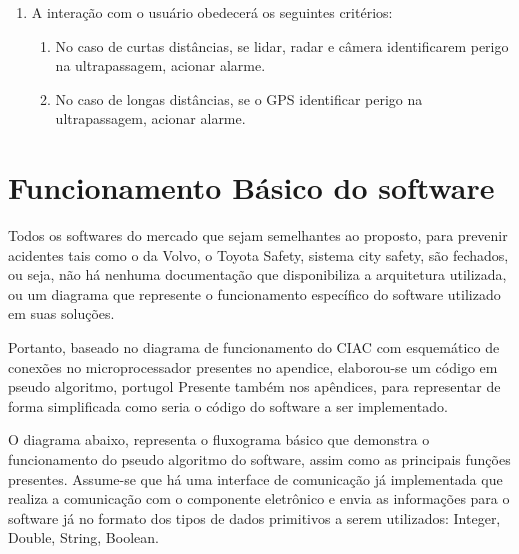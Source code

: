 \begin{enumerate}
\item A interação com o usuário obedecerá os seguintes critérios:

\begin{enumerate}
	\item No caso de curtas distâncias, se lidar, radar e câmera identificarem perigo na ultrapassagem, acionar alarme.
	\item No caso de longas distâncias, se o GPS identificar perigo na ultrapassagem, acionar alarme.

\end{enumerate}
\end{enumerate}


\section{Funcionamento Básico do software}

Todos os softwares do mercado que sejam semelhantes ao proposto, para prevenir acidentes tais como o da Volvo, o Toyota Safety, sistema city safety, são fechados, ou seja, não há nenhuma documentação que disponibiliza a arquitetura utilizada, ou um diagrama que represente o funcionamento específico do software utilizado em suas soluções.

Portanto, baseado no diagrama de funcionamento do CIAC com esquemático de conexões no microprocessador presentes no apendice, elaborou-se um código em pseudo algoritmo, portugol Presente também nos apêndices, para representar de forma simplificada como seria o código do software a ser implementado.

O diagrama abaixo, representa o fluxograma básico que demonstra o funcionamento do pseudo algoritmo do software, assim como as principais funções presentes. Assume-se que há uma interface de comunicação já implementada que realiza a comunicação com o componente eletrônico e envia as informações para o software já no formato dos tipos de dados primitivos a serem utilizados: Integer, Double, String, Boolean.

